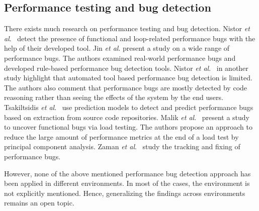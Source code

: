 \subsection{Performance testing and bug detection}

There exists much research on performance testing and bug detection. Nistor \textit{et al$.$}~\cite{Nistor} detect the presence of functional and loop-related performance bugs with the help of their developed tool. Jin \textit{et al$.$} \cite{Jin} present a study on a wide range of performance bugs. The authors examined real-world performance bugs and developed rule-based performance bug detection tools. Nistor \textit{et al$.$}~\cite{nistor_2} in another study highlight that automated tool based performance bug detection is limited. The authors also comment that performance bugs are mostly detected by code reasoning rather than seeing the effects of the system by the end users. Tsakiltsidis \textit{et al$.$}~\cite{Tsakiltsidis} use prediction models to detect and predict performance bugs based on extraction from source code repositories. Malik \textit{et al$.$}~\cite{h_malik_p_bugs} present a study to uncover functional bugs via load testing. The authors propose an approach to reduce the large amount of performance metrics at the end of a load test by principal component analysis. Zaman \textit{et al$.$}~\cite{zaman_p_bugs} study the tracking and fixing of performance bugs.

However, none of the above mentioned performance bug detection approach has been applied in different environments. In most of the cases, the environment is not explicitly mentioned. Hence, generalizing the findings across environments remains an open topic.
